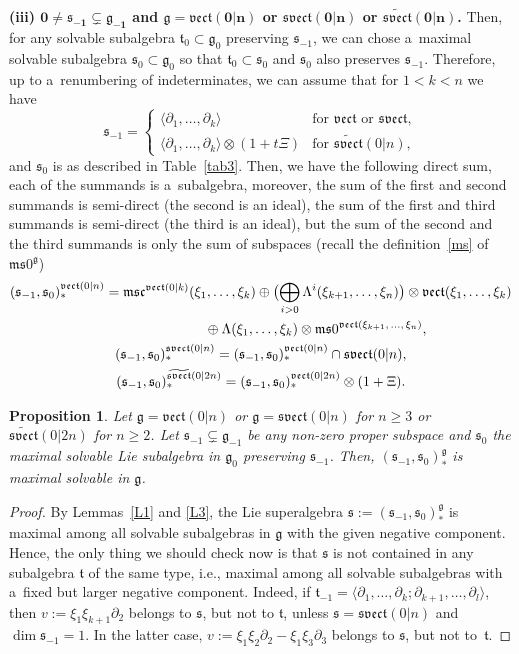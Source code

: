 \documentclass[10pt,a4paper]{amsart}
\newcommand{\del}{\partial}
\newcommand {\fc} {{\mathfrak{c}}}
\newcommand {\fg} {{\mathfrak{g}}} %
\newcommand {\fm} {{\mathfrak{m}}}
\newcommand {\fs} {{\mathfrak{s}}}
\newcommand {\fsvect} {{\mathfrak{svect}}}
\newcommand {\ft} {{\mathfrak{t}}}
\newcommand {\fvect} {{\mathfrak{vect}}} %
\newcommand {\<} [2] {{\left.\vphantom{#2}\right.^{#1\!}\!{#2}}}
\numberwithin{equation}{section}
\newtheorem{Proposition}[Theorem]{Proposition}
\begin{document}
{\bf (iii) $\boldsymbol{0\neq\fs_{-1}\subsetneq\fg_{-1}}$ and $\boldsymbol{\fg=\fvect(0|n)}$ or $\boldsymbol{\fsvect(0|n)}$ or $\boldsymbol{\widetilde\fsvect(0|n)}$.}
Then, for any solvable subalgebra $\ft_0\subset \fg_0$ preserving $\fs_{-1}$, we can chose a~maximal solvable subalgebra $\fs_0\subset \fg_0$ so that $\ft_0\subset \fs_0$ and $\fs_0$ also preserves $\fs_{-1}$. Therefore, up to a~renumbering of indeterminates, we can assume that for $1<k<n$ we have
\[
\fs_{-1}=\begin{cases}\langle \del_1,\dots, \del_k\rangle&\text{for $\fvect$ or $\fsvect$,}\\
\langle \del_1,\dots, \del_k\rangle\otimes (1+t\Xi)&\text{for $\widetilde\fsvect(0|n)$},
\end{cases}
\]
and $\fs_0$ is as described in Table~\ref{tab3}. Then, we have the following direct sum, each of the summands is a~subalgebra, moreover, the sum of the first and second summands is semi-direct (the second is an ideal), the sum of the first and third summands is semi-direct (the third is an ideal), but the sum of the second and the third summands is only the sum of subspaces (recall the definition~\eqref{ms} of $\fm\fs0^{\fg}$)
\begin{gather}
(\fs_{-1}, \fs_{0})_*^{\fvect(0|n)}= \fm\fs\fc^{\fvect(0|k)}(\xi_1,\dots,\xi_k)\oplus \bigl(\bigoplus_{i>0} \Lambda^i(\xi_{k+1},\dots,\xi_n)\bigr)\otimes \fvect(\xi_1,\dots,\xi_k) \nonumber\\
\hphantom{(\fs_{-1}, \fs_{0})_*^{\fvect(0|n)}=}{}
\oplus\Lambda(\xi_{1},\dots,\xi_k)\otimes \fm\fs0^{\fvect(\xi_{k+1},\, \dots, \, \xi_n)},\nonumber\\
(\fs_{-1}, \fs_{0})_*^{\fsvect(0|n)}= (\fs_{-1}, \fs_{0})_*^{\fvect(0|n)}\cap\fsvect(0|n),\nonumber\\
(\fs_{-1}, \fs_{0})_*^{\widetilde\fsvect(0|2n)}= (\fs_{-1}, \fs_{0})_*^{\fvect(0|2n)}\otimes(1+\Xi)\label{(**)}.
\end{gather}


\begin{Proposition}\label{P3} Let $\fg=\fvect(0|n)$ or $\fg=\fsvect(0|n)$ for $n\geq 3$ or $\widetilde{\fsvect}(0|2n)$ for $n\geq 2$. Let $\fs_{-1}\subsetneq\fg_{-1}$ be any non-zero proper subspace and $\fs_{0}$ the maximal solvable Lie subalgebra in $\fg_0$ preserving $\fs_{-1}$. Then, $(\fs_{-1}, \fs_0)_*^\fg$ is maximal solvable in $\fg$.
\end{Proposition}



\begin{proof}
By Lemmas~\ref{L1} and \ref{L3}, the Lie superalgebra $\fs:=(\fs_{-1}, \fs_0)_*^\fg$ is maximal among all solvable subalgebras in $\fg$ with the given negative component. Hence, the only thing we should check now is that $\fs$ is not contained in any subalgebra $\ft$ of the same type, i.e., maximal among all solvable subalgebras with a~fixed but larger negative component.
Indeed, if $\ft_{-1}=\langle \del_1,\dots,\del_k; \del_{k+1},\dots,\del_{l}\rangle $, then $v:=\xi_1\xi_{k+1}\del_2$ belongs to $\fs$, but not to $\ft$, unless $\fs=\fsvect(0|n)$ and $\dim\fs_{-1}=1$. In the latter case, ${v:=\xi_1\xi_{2}\del_2-\xi_1\xi_{3}\del_3}$ belongs to $\fs$, but not to~$\ft$.
\end{proof}
\end{document}
